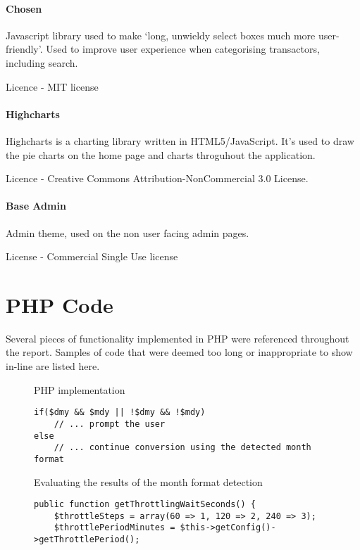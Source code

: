 \begin{appendices}
\subsubsection{Chosen}
Javascript library used to make `long, unwieldy select boxes much more user-friendly'.
%
Used to improve user experience when categorising transactors, including search.

Licence - MIT license

\subsubsection{Highcharts}
Highcharts is a charting library written in HTML5/JavaScript.
%
It's used to draw the pie charts on the home page and charts throguhout the application.

Licence - Creative Commons Attribution-NonCommercial 3.0 License.

\subsubsection{Base Admin}
Admin theme, used on the non user facing admin pages.

License - Commercial Single Use license

\chapter{PHP Code}
Several pieces of functionality implemented in PHP were referenced throughout the report. Samples of code that were deemed too long or inappropriate to show in-line are listed here.

\pagebreak
\enlargethispage{10\baselineskip}
\begin{figure}[H]

\caption{PHP  implementation}
\label{fig:settransactor}
\end{figure}
\pagebreak

\begin{figure}
\lstset{style=phpcolor}
\begin{lstlisting}
if($dmy && $mdy || !$dmy && !$mdy)
    // ... prompt the user
else
    // ... continue conversion using the detected month format
\end{lstlisting}
\caption{Evaluating the results of the month format detection}
\end{figure}

\begin{figure}
\centering
\begin{lstlisting}[style=phpcolor]
public function getThrottlingWaitSeconds() {
	$throttleSteps = array(60 => 1, 120 => 2, 240 => 3);
	$throttlePeriodMinutes = $this->getConfig()->getThrottlePeriod();
	

\end{lstlisting}
\end{figure}
\end{appendices}
